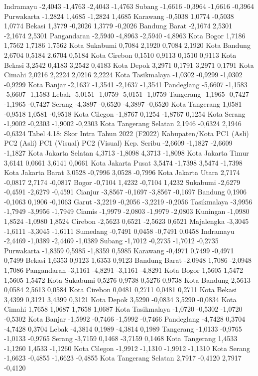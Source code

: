 Indramayu -2,4043 -1,4763 -2,4043 -1,4763 Subang -1,6616 -0,3964 -1,6616 -0,3964 Purwakarta -1,2824 1,4685 -1,2824 1,4685 Karawang -0,5038 1,0774 -0,5038 1,0774 Bekasi 1,3779 -0,2026 1,3779 -0,2026 Bandung Barat -2,1674 2,5301 -2,1674 2,5301 Pangandaran -2,5940 -4,8963 -2,5940 -4,8963 Kota Bogor 1,7186 1,7562 1,7186 1,7562 Kota Sukabumi 0,7084 2,1920 0,7084 2,1920 Kota Bandung 2,6704 0,5184 2,6704 0,5184 Kota Cirebon 0,1510 0,9113 0,1510 0,9113 Kota Bekasi 3,2542 0,4183 3,2542 0,4183 Kota Depok 3,2971 0,1791 3,2971 0,1791 Kota Cimahi 2,0216 2,2224 2,0216 2,2224 Kota Tasikmalaya -1,0302 -0,9299 -1,0302 -0,9299 Kota Banjar -2,1637 -1,3541 -2,1637 -1,3541 Pandeglang -5,6607 -1,1583 -5,6607 -1,1583 Lebak -5,0151 -1,0759 -5,0151 -1,0759 Tangerang -1,1965 -0,7427 -1,1965 -0,7427 Serang -4,3897 -0,6520 -4,3897 -0,6520 Kota Tangerang 1,0581 -0,9518 1,0581 -0,9518 Kota Cilegon -1,8767 0,1254 -1,8767 0,1254 Kota Serang -1,9002 -0,2303 -1,9002 -0,2303 Kota Tangerang Selatan 2,1946 -0,6324 2,1946 -0,6324
Tabel 4.18: Skor Intra Tahun
2022 (F2022)
Kabupaten/Kota PC1 (Asli) PC2 (Asli) PC1 (Visual) PC2 (Visual) Kep. Seribu -2,6609 -1,1827 -2,6609 -1,1827 Kota Jakarta Selatan 4,3713 -1,8098 4,3713 -1,8098 Kota Jakarta Timur 3,6141 0,0661 3,6141 0,0661 Kota Jakarta Pusat 3,5474 -1,7398 3,5474 -1,7398 Kota Jakarta Barat 3,0528 -0,7996 3,0528 -0,7996 Kota Jakarta Utara 2,7174 -0,0817 2,7174 -0,0817 Bogor -0,7104 1,4232 -0,7104 1,4232 Sukabumi -2,6279 -0,4591 -2,6279 -0,4591 Cianjur -3,8567 -0,1697 -3,8567 -0,1697 Bandung 0,1906 -0,1063 0,1906 -0,1063 Garut -3,2219 -0,2056 -3,2219 -0,2056 Tasikmalaya -3,9956 -1,7949 -3,9956 -1,7949 Ciamis -1,9979 -2,0803 -1,9979 -2,0803 Kuningan -1,0980 1,8524 -1,0980 1,8524 Cirebon -2,5623 0,6521 -2,5623 0,6521 Majalengka -3,3045 -1,6111 -3,3045 -1,6111 Sumedang -0,7491 0,0458 -0,7491 0,0458
Indramayu -2,4469 -1,0389 -2,4469 -1,0389 Subang -1,7012 -0,2735 -1,7012 -0,2735 Purwakarta -1,8359 0,5985 -1,8359 0,5985 Karawang -0,4971 0,7499 -0,4971 0,7499 Bekasi 1,6353 0,9123 1,6353 0,9123 Bandung Barat -2,0948 1,7086 -2,0948 1,7086 Pangandaran -3,1161 -4,8291 -3,1161 -4,8291 Kota Bogor 1,5605 1,5472 1,5605 1,5472 Kota Sukabumi 0,5276 0,9738 0,5276 0,9738 Kota Bandung 2,5613 0,0584 2,5613 0,0584 Kota Cirebon 0,0481 0,2711 0,0481 0,2711 Kota Bekasi 3,4399 0,3121 3,4399 0,3121 Kota Depok 3,5290 -0,0834 3,5290 -0,0834 Kota Cimahi 1,7658 1,0687 1,7658 1,0687 Kota Tasikmalaya -1,0720 -0,5302 -1,0720 -0,5302 Kota Banjar -1,5992 -0,7466 -1,5992 -0,7466 Pandeglang -4,7428 0,3704 -4,7428 0,3704 Lebak -4,3814 0,1989 -4,3814 0,1989 Tangerang -1,0133 -0,9765 -1,0133 -0,9765 Serang -3,7159 0,1468 -3,7159 0,1468 Kota Tangerang 1,4533 -1,1260 1,4533 -1,1260 Kota Cilegon -1,9912 -1,1310 -1,9912 -1,1310 Kota Serang -1,6623 -0,4855 -1,6623 -0,4855 Kota Tangerang Selatan 2,7917 -0,4120 2,7917 -0,4120
